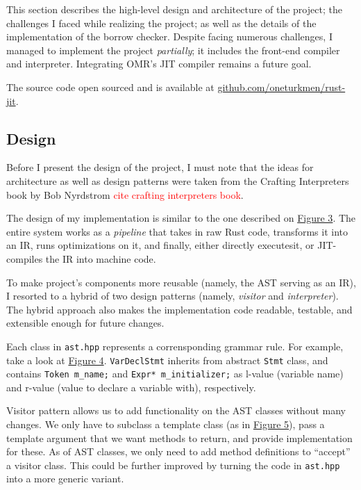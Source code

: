 
This section describes the high-level design and architecture of the project;
the challenges I faced while realizing the project; as well as
the details of the implementation of the borrow checker.
Despite facing numerous challenges, I managed to implement the project
\textit{partially}; it includes the front-end compiler and interpreter.
Integrating OMR's JIT compiler remains a future goal.

The source code open sourced and is available at \href{https://github.com/oneturkmen/rust-jit}{github.com/oneturkmen/rust-jit}.


\subsection{Design}

Before I present the design of the project, I must note that
the ideas for architecture as well as design patterns
were taken from the Crafting Interpreters book by Bob Nyrdstrom
\textcolor{red}{cite crafting interpreters book}.

The design of my implementation is similar to the one described
on \hyperref[arch1]{Figure 3}. The entire system works as a \textit{pipeline}
that takes in raw Rust code, transforms it into an IR, runs optimizations on it,
and finally, either directly executesit, or JIT-compiles the IR into machine code.

To make project's components more reusable (namely, the AST serving as an IR),
I resorted to a hybrid of two design patterns (namely, \textit{visitor} and
\textit{interpreter}). The hybrid approach also makes the implementation code
readable, testable, and extensible enough for future changes.

Each class in \texttt{ast.hpp} represents a corrensponding grammar rule. For
example, take a look at \hyperref[cpp1]{Figure 4}. \texttt{VarDeclStmt}
inherits from abstract \texttt{Stmt} class, and contains \texttt{Token m\_name;}
and \texttt{Expr* m\_initializer;} as l-value (variable name) and
r-value (value to declare a variable with), respectively.

Visitor pattern allows us to add functionality on the AST classes
without many changes. We only have to subclass a template class (as in
\hyperref[cpp2]{Figure 5}), pass a template argument that we want methods
to return, and provide implementation for these. As of AST classes,
we only need to add method definitions to ``accept'' a visitor
class. This could be further improved by turning the code in \texttt{ast.hpp}
into a more generic variant.

